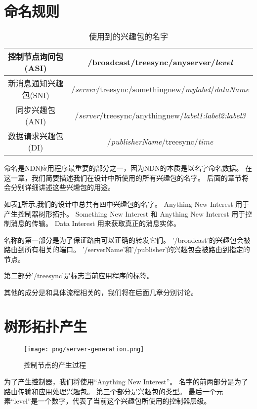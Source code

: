 
\section{命名规则}

\begin{table}
\renewcommand{\arraystretch}{1.3}
\caption{使用到的兴趣包的名字}
\label{table:only}
\centering
\begin{tabular}{|c|c|}
\hline
控制节点询问包(ASI) & /broadcast/treesync/anyserver/\emph{level}\\
\hline
新消息通知兴趣包(SNI) & /\emph{server}/treesync/somethingnew/\emph{mylabel}/\emph{dataName}\\
\hline
同步兴趣包(ANI) & /\emph{server}/treesync/anythingnew/\emph{label1:label2:label3}\\
\hline
数据请求兴趣包(DI) & /\emph{publisherName}/treesync/\emph{time}\\
\hline
\end{tabular}
\end{table}

命名是NDN应用程序最重要的部分之一，因为NDN的本质是以名字命名数据。
在这一章，我们简要描述我们在设计中所使用的所有兴趣包的名字。
后面的章节将会分别详细讲述这些兴趣包的用途。

如表\ref{table:only}所示,我们的设计中总共有四中兴趣包的名字。
Anything New Interest 用于产生控制器树形拓扑。
Something New Interest 和 Anything New Interest 用于控制消息的传输。
Data Interest 用来获取真正的消息实体。

名称的第一部分是为了保证路由可以正确的转发它们。
’/broadcast’的兴趣包会被路由到所有相关的端口。
’/serverName’和’/publisher’的兴趣包会被路由到指定的节点。

第二部分’/treesync’是标志当前应用程序的标签。

其他的成分是和具体流程相关的，我们将在后面几章分别讨论。


\section{树形拓扑产生}

\begin{figure}
\centering
\texttt{[image: png/server-generation.png]}
\caption{控制节点的产生过程}
\label{fig:topo_gen}
\end{figure}

为了产生控制器，我们将使用“Anything New Interest”。
名字的前两部分是为了路由传输和应用处理兴趣包。
第三个部分是兴趣包的类型。
最后一个元素“level”是一个数字，代表了当前这个兴趣包所使用的控制器层级。

